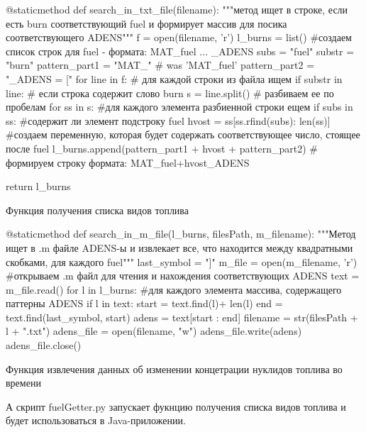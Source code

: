 
\begin{Program}[H]
\begin{MyCode}
@staticmethod
def search_in_txt_file(filename):
"""метод ищет в строке, если есть burn соответствующий fuel и
формирует массив для посика соответствующего ADENS"""
f = open(filename, 'r')
l_burns = list() #создаем список строк для fuel - формата:
					 MAT_fuel ... _ADENS
subs = "fuel"
substr = "burn"
pattern_part1 = "MAT_"   # was 'MAT_fuel'
pattern_part2 = "_ADENS = ["
for line in f:  # для каждой строки из файла ищем
	if substr in line:  # если строка содержит слово burn
		s = line.split()  # разбиваем ее по пробелам
		for ss in s:  #для каждого элемента 
		разбиенной строки ещем
			if subs in ss: #содержит ли элемент
				подстроку fuel
			   hvost = ss[ss.rfind(subs): len(ss)]  
				#создаем переменную, которая
				 будет содержать 
				соответствующее число,
				 стоящее после fuel
		l_burns.append(pattern_part1 + hvost +
						 pattern_part2) 
		  # формируем строку формата: 
			 	MAT_fuel+hvost_ADENS

return l_burns
\end{MyCode}
\label{fuelList}
\caption{Функция получения списка видов топлива}
\end{Program}

\begin{Program}[H]
\begin{MyCode}
		@staticmethod
		def search_in_m_file(l_burns, filesPath, m_filename):
		"""Метод ищет в .m файле ADENS-ы и извлекает все, что
		находится между квадратными скобками, для каждого fuel"""
		last_symbol = "]"
		m_file = open(m_filename, 'r') #открываем .m файл для чтения 
		и нахождения соответствующих ADENS
		text = m_file.read()
		for l in l_burns:  #для каждого элемента массива, 
		содержащего паттерны ADENS
		if l in text:
		start = text.find(l)+ len(l)
		end = text.find(last_symbol, start)
		adens = text[start : end]
		filename = str(filesPath + l + ".txt")
		adens_file = open(filename, "w")
		adens_file.write(adens)
		adens_file.close()		
\end{MyCode}
\label{adens}
\caption{Функция извлечения данных об изменении концетрации нуклидов топлива во времени}
\end{Program}

А скрипт fuelGetter.py запускает фукнцию получения списка видов топлива и будет использоваться в Java-приложении.



